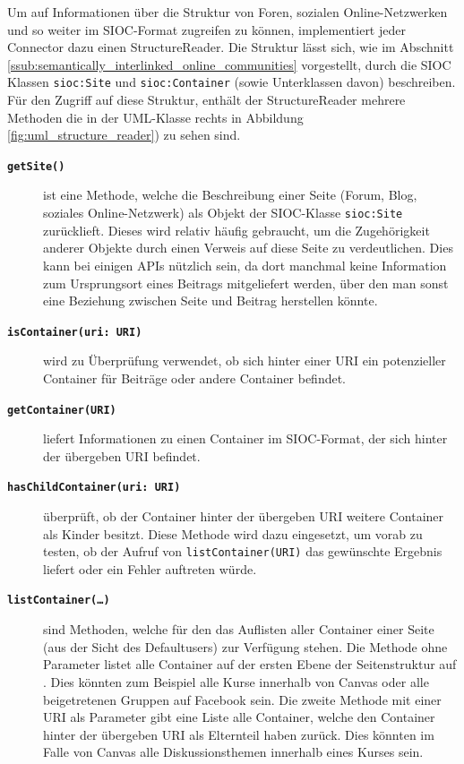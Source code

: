 Um auf Informationen über die Struktur von Foren, sozialen Online-Netzwerken und so weiter im SIOC-Format zugreifen zu können, implementiert jeder Connector dazu einen StructureReader. Die Struktur lässt sich, wie im Abschnitt \ref{ssub:semantically_interlinked_online_communities} vorgestellt, durch die SIOC Klassen \texttt{sioc:Site} und \texttt{sioc:Container} (sowie Unterklassen davon) beschreiben. Für den Zugriff auf diese Struktur, enthält der StructureReader mehrere Methoden die in der UML-Klasse rechts in Abbildung \ref{fig:uml_structure_reader}) zu sehen sind. \wrapfill

\begin{description}
    \item[\textbf{\texttt{getSite()}}] ist eine Methode, welche die Beschreibung einer Seite (Forum, Blog, soziales Online-Netzwerk) als Objekt der SIOC-Klasse \texttt{sioc:Site} zurücklieft. Dieses wird relativ häufig gebraucht, um die Zugehörigkeit anderer Objekte durch einen Verweis auf diese Seite zu verdeutlichen. Dies kann bei einigen APIs nützlich sein, da dort manchmal keine Information zum Ursprungsort eines Beitrags mitgeliefert werden, über den man sonst eine Beziehung zwischen Seite und Beitrag herstellen könnte.

    \item[\textbf{\texttt{isContainer(uri: URI)}}] wird zu Überprüfung verwendet, ob sich hinter einer URI ein potenzieller Container für Beiträge oder andere Container befindet. 

    \item[\textbf{\texttt{getContainer(URI)}}] liefert Informationen zu einen Container im SIOC-Format, der sich hinter der übergeben URI befindet.

    \item[\textbf{\texttt{hasChildContainer(uri: URI)}}] überprüft, ob der Container hinter der übergeben URI weitere Container als Kinder besitzt. Diese Methode wird dazu eingesetzt, um vorab zu testen, ob der Aufruf von \texttt{listContainer(URI)} das gewünschte Ergebnis liefert oder ein Fehler auftreten würde. 

    \item[\textbf{\texttt{listContainer(\dots)}}] sind Methoden, welche für den das Auflisten aller Container einer Seite (aus der Sicht des Defaultusers) zur Verfügung stehen. Die Methode ohne Parameter listet alle Container auf der ersten Ebene der Seitenstruktur auf . Dies könnten zum Beispiel alle Kurse innerhalb von Canvas oder alle beigetretenen Gruppen auf Facebook sein. Die zweite Methode mit einer URI als Parameter gibt eine Liste alle Container, welche den Container hinter der übergeben URI als Elternteil haben zurück. Dies könnten im Falle von Canvas alle Diskussionsthemen innerhalb eines Kurses sein.
\end{description}

